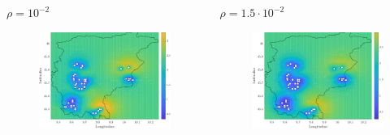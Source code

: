 \begin{frame}
	
	\begin{columns}[T]
		\begin{column}[t]{0.5\linewidth}
			\centering
			$\rho = 10^{-2}$
			\begin{figure}
				\includegraphics[width=\textwidth]{../Tesi/Immagini/2. Nuovo modello/Mappa potenziale, rho = 0.01}
			\end{figure}
		\end{column}
		\begin{column}[t]{0.5\linewidth}
			\centering
			$\rho = 1.5\cdot 10^{-2}$
			\begin{figure}
				\includegraphics[width=\textwidth]{../Tesi/Immagini/2. Nuovo modello/Mappa potenziale, rho = 0.015}
			\end{figure}
		\end{column}
	\end{columns}
	
\end{frame}